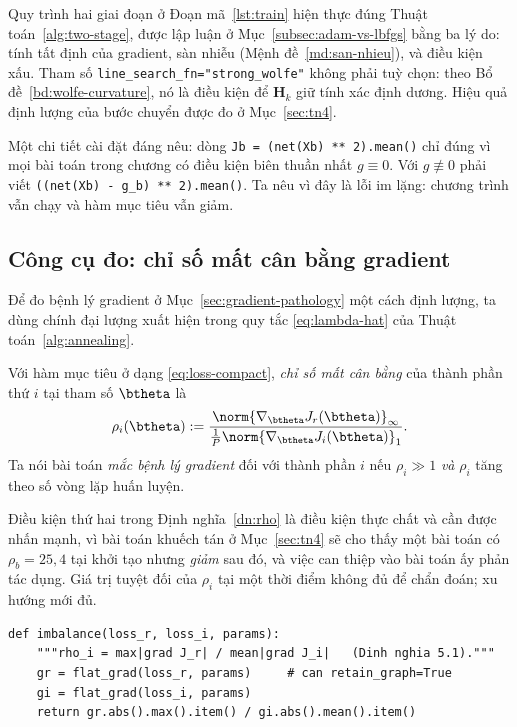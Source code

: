 Quy trình hai giai đoạn ở Đoạn mã~\ref{lst:train} hiện thực đúng
Thuật toán~\ref{alg:two-stage}, được lập luận ở Mục~\ref{subsec:adam-vs-lbfgs}
bằng ba lý do: tính tất định của gradient, sàn nhiễu
(Mệnh đề~\ref{md:san-nhieu}), và điều kiện xấu. Tham số
\texttt{line\_search\_fn="strong\_wolfe"} không phải tuỳ chọn: theo
Bổ đề~\ref{bd:wolfe-curvature}, nó là điều kiện để $\bm{H}_k$ giữ tính xác định
dương. Hiệu quả định lượng của bước chuyển được đo ở Mục~\ref{sec:tn4}.
 
Một chi tiết cài đặt đáng nêu: dòng \texttt{Jb = (net(Xb) ** 2).mean()} chỉ đúng
vì mọi bài toán trong chương có điều kiện biên thuần nhất $g \equiv 0$. Với
$g \not\equiv 0$ phải viết \texttt{((net(Xb) - g\_b) ** 2).mean()}. Ta nêu vì đây
là lỗi im lặng: chương trình vẫn chạy và hàm mục tiêu vẫn giảm.
 
\subsection{Công cụ đo: chỉ số mất cân bằng gradient}
\label{ssec:rho}
 
Để đo bệnh lý gradient ở Mục~\ref{sec:gradient-pathology} một cách định lượng, ta
dùng chính đại lượng xuất hiện trong quy tắc \eqref{eq:lambda-hat} của
Thuật toán~\ref{alg:annealing}.
 
\begin{definition}
\label{dn:rho}
Với hàm mục tiêu ở dạng \eqref{eq:loss-compact}, \emph{chỉ số mất cân bằng} của
thành phần thứ $i$ tại tham số $\btheta$ là
\begin{equation}
\rho_i(\btheta)
 := \frac{\norm{\nabla_{\btheta} J_r(\btheta)}_{\infty}}
         {\tfrac{1}{P}\norm{\nabla_{\btheta} J_i(\btheta)}_{1}} .
\label{eq:rho}
\end{equation}
Ta nói bài toán \emph{mắc bệnh lý gradient} đối với thành phần $i$ nếu
$\rho_i \gg 1$ \emph{và} $\rho_i$ tăng theo số vòng lặp huấn luyện.
\end{definition}
 
Điều kiện thứ hai trong Định nghĩa~\ref{dn:rho} là điều kiện thực chất và cần
được nhấn mạnh, vì bài toán khuếch tán ở Mục~\ref{sec:tn4} sẽ cho thấy một
bài toán có
$\rho_b = 25{,}4$ tại khởi tạo nhưng \emph{giảm} sau đó, và việc can thiệp vào bài
toán ấy phản tác dụng. Giá trị tuyệt đối của $\rho_i$ tại một thời điểm không đủ
để chẩn đoán; xu hướng mới đủ.
 
\begin{lstlisting}[caption={Đo chỉ số mất cân bằng $\rho_i$ theo \eqref{eq:rho}.},label={lst:rho}]
def imbalance(loss_r, loss_i, params):
    """rho_i = max|grad J_r| / mean|grad J_i|   (Dinh nghia 5.1)."""
    gr = flat_grad(loss_r, params)     # can retain_graph=True
    gi = flat_grad(loss_i, params)
    return gr.abs().max().item() / gi.abs().mean().item()
\end{lstlisting}
 
